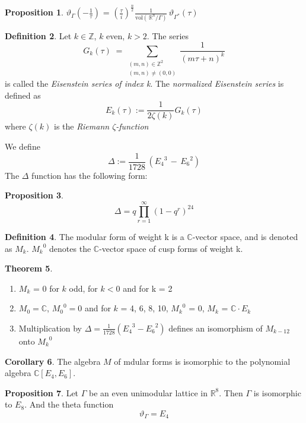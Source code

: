 \documentclass[12pt]{article}
\theoremstyle{definition}
\newtheorem{theorem}{Theorem}[section]
\newtheorem{definition}[theorem]{Definition}
\newtheorem{collary}[theorem]{Corollary}
\newtheorem{prop}[theorem]{Proposition}
\numberwithin{equation}{theorem}
\numberwithin{figure}{theorem}
\newcommand{\thetaFunction}[1]{\ensuremath{\vartheta_{#1}}}
\newcommand{\modularK}[1]{\ensuremath{M_{#1}}}
\newcommand{\eisenSeries}[1]{\ensuremath{E_{#1}}}
\newcommand{\Integer}{\ensuremath{\mathbb{Z}}}
\newcommand{\Real}{\ensuremath{\mathbb{R}}}
\newcommand{\Complex}{\ensuremath{\mathbb{C}}}
\begin{document}
\begin{prop}\label{latticeAndDualThetaProp}
	$\thetaFunction{\Gamma}(-\frac{1}{\tau})$ = $(\frac{\tau}{i})^{\frac{n}{2}} \frac{1}{\mbox{vol}(\,\Real^n/\Gamma)}\,\thetaFunction{\Gamma^{*}}(\tau)$
\end{prop}
\begin{definition}
Let $k \in \Integer$, $k$ even, $k > 2.$ The series
\[
	G_k(\tau) \; = \sum_{\substack{(m,n) \in \Integer^2\\				 (m,n) \neq (0,0)}} \frac{1}{(m\tau + n)^k}
\]
is called the \emph{Eisenstein series of index k}.
The \emph{normalized Eisenstein series} is defined as
\[
	\eisenSeries{k}(\tau) := \frac{1}{2\zeta(k)} G_k(\tau)
\]
where $\zeta(k)$ is the \emph{Riemann $\zeta$-function}
\end{definition}
We define
\[
	\Delta := \frac{1}{1728}\,(\eisenSeries{4}^3 \, - \, \eisenSeries{6}^2) 
\]
The $\Delta$ function has the following form:
\begin{prop}\label{deltaExpansionProp}
\[
	\Delta = q \prod_{r = 1}^{\infty}(1 - q^r)^{24}
\]
\end{prop}
\begin{definition}
	The modular form of weight k is a $\Complex$-vector space, and is denoted as {\modularK{k}}. $\modularK{k}^0$ denotes the $\Complex$-vector space of cusp forms of weight k.
\end{definition}
\begin{theorem}\label{cuspFormTheo}\hfill
\begin{enumerate}
	\item $\modularK{k}$ = 0 for $k$ odd, for $k < 0$ and for k = 2
	\item $\modularK{0} = \Complex$, $\modularK{0}^0 = 0$ and for $k$ = 4, 6, 8, 10, $\modularK{k}^0 $ = 0, $\modularK{k}$ = $\Complex \cdot \eisenSeries{k}$\
	\item Multiplication by $\Delta = \frac{1}{1728}(\eisenSeries{4}^3 -\eisenSeries{6}^2)$ defines an isomorphism of $\modularK{k-12}$ onto $\modularK{k}^0$
\end{enumerate}
\end{theorem}
\begin{collary}\label{E4E6collary}
The algebra $M$ of mdular forms is isomorphic to the polynomial algebra $\Complex[{\eisenSeries{4}}, {\eisenSeries{6}}]$.
\end{collary}
\begin{prop}\label{E8isomorphProp}
Let $\Gamma$ be an even unimodular lattice in $\Real^8$. Then
$\Gamma$ is isomorphic to $E_8$. And the theta function 
\[
	\thetaFunction{\Gamma} = E_4
\]
\end{prop}
\end{document}
